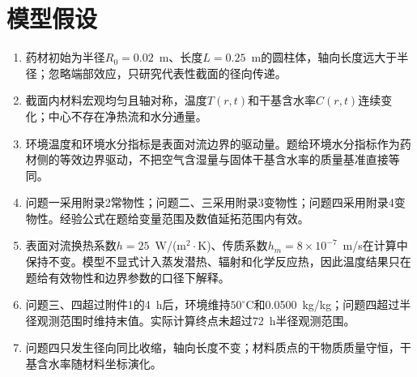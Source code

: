 \documentclass[UTF8,a4paper,zihao=-4,fontset=fandol]{ctexart}
\begin{document}
\section{模型假设}
\label{sec:assumptions}
\begin{enumerate}
  \item 药材初始为半径$R_0=0.02$~m、长度$L=0.25$~m的圆柱体，轴向长度远大于半径；忽略端部效应，只研究代表性截面的径向传递。
  \item 截面内材料宏观均匀且轴对称，温度$T(r,t)$和干基含水率$C(r,t)$连续变化；中心不存在净热流和水分通量。
  \item 环境温度和环境水分指标是表面对流边界的驱动量。题给环境水分指标作为药材侧的等效边界驱动，不把空气含湿量与固体干基含水率的质量基准直接等同。
  \item 问题一采用附录2常物性；问题二、三采用附录3变物性；问题四采用附录4变物性。经验公式在题给变量范围及数值延拓范围内有效。
  \item 表面对流换热系数$h=25$~W/(m$^2\cdot$K)、传质系数$h_m=8\times10^{-7}$~m/s在计算中保持不变。模型不显式计入蒸发潜热、辐射和化学反应热，因此温度结果只在题给有效物性和边界参数的口径下解释。
  \item 问题三、四超过附件1的4~h后，环境维持$50^\circ\mathrm C$和0.0500~kg/kg；问题四超过半径观测范围时维持末值。实际计算终点未超过72~h半径观测范围。
  \item 问题四只发生径向同比收缩，轴向长度不变；材料质点的干物质质量守恒，干基含水率随材料坐标演化。
\end{enumerate}
\end{document}
